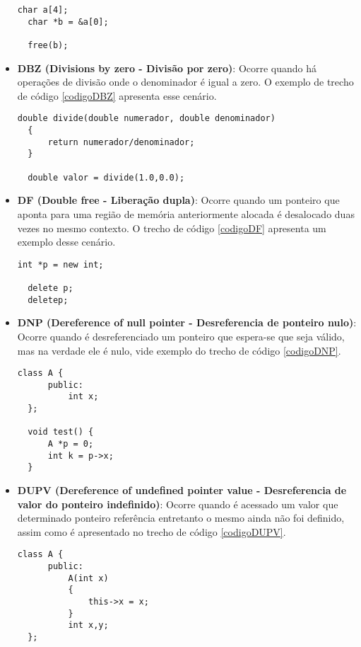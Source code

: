 \begin{itemize}
    \begin{lstlisting}[caption={Código exemplo BF}, label=codigoBF]
  char a[4];
  char *b = &a[0];

  free(b);
    \end{lstlisting}
  \item \textbf{DBZ (Divisions by zero - Divisão por zero)}: Ocorre quando há operações de divisão onde o denominador é igual
    a zero. O exemplo de trecho de código \ref{codigoDBZ} apresenta esse cenário.

    \begin{lstlisting}[caption={Código exemplo DBZ}, label=codigoDBZ]
  double divide(double numerador, double denominador)
  {
      return numerador/denominador;
  }

  double valor = divide(1.0,0.0);
    \end{lstlisting}
  \item \textbf{DF (Double free - Liberação dupla)}: Ocorre quando um ponteiro que aponta para uma região de memória 
    anteriormente alocada é desalocado duas vezes no mesmo contexto. O trecho de código \ref{codigoDF} apresenta um exemplo
    desse cenário.

    \begin{lstlisting}[caption={Código exemplo DF}, label=codigoDF]
  int *p = new int;

  delete p;
  deletep;
    \end{lstlisting}
  \item \textbf{DNP (Dereference of null pointer - Desreferencia de ponteiro nulo)}: Ocorre quando é desreferenciado um 
    ponteiro que espera-se que seja válido, mas na verdade ele é nulo, vide exemplo do trecho de código \ref{codigoDNP}.

    \begin{lstlisting}[caption={Código exemplo DNP}, label=codigoDNP]
  class A {
      public:
          int x;
  };

  void test() {
      A *p = 0;
      int k = p->x;
  } 
    \end{lstlisting}
  \item \textbf{DUPV (Dereference of undefined pointer value - Desreferencia de valor do ponteiro indefinido)}: Ocorre 
    quando é acessado um valor que determinado ponteiro referência entretanto o mesmo ainda não foi definido, assim como é
    apresentado no trecho de código \ref{codigoDUPV}.

    \begin{lstlisting}[caption={Código exemplo DUPV}, label=codigoDUPV]
  class A {
      public:
          A(int x)
          {
              this->x = x;
          }
          int x,y;
  };


\end{lstlisting}
\end{itemize}
